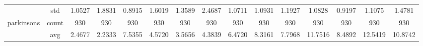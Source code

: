 \begin{table}[H]
{\begin{tabular}{rcccc|c|c|c|c|c|ccccc}
			                                                                               & std                                    & 1.0527                                                                             & 1.8831                                                                    & 0.8915                                                                    & 1.6019                                         & 1.3589                                                                    & 2.4687                                       & 1.0711                                      & 1.0931                                         & 1.1927                                         & 1.0828                                          & 0.9197                                          & 1.1075                                         & 1.4781                                         \\
			parkinsons                                                                     & count                                  & 930                                                                                & 930                                                                       & 930                                                                       & 930                                            & 930                                                                       & 930                                          & 930                                         & 930                                            & 930                                            & 930                                             & 930                                             & 930                                            & 930                                            \\
			                                                                               & avg                                    & 2.4677                                                                             & \cellcolor[rgb]{ .776,  .937,  .808}\textcolor[rgb]{ 0,  .38,  0}{2.2333} & 7.5355                                                                    & 4.5720                                         & 3.5656                                                                    & 4.3839                                       & 6.4720                                      & 8.3161                                         & 7.7968                                         & 11.7516                                         & 8.4892                                          & 12.5419                                        & 10.8742                                        \\

\end{tabular}}
\end{table}
